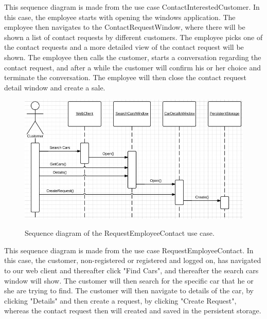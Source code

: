 This sequence diagram is made from the use case ContactInterestedCustomer. 
In this case, the employee starts with opening the windows application. The employee then navigates to the ContactRequestWindow, where there will be shown a list of contact requests by different customers. The employee picks one of the contact requests and a more detailed view of the contact request will be shown. The employee then calls the customer, starts a conversation regarding the contact request, and after a while the customer will confirm his or her choice and terminate the conversation. The employee will then close the contact request detail window and create a sale.

\begin{figure}[H]
	\centering
		\includegraphics[width=\textwidth]{Figures/SequenceDiagram-RequestEmployeeContact}\\
	\caption{Sequence diagram of the RequestEmployeeContact use case.}
  \label{fig:SequenceDiagram-RequestEmployeeContact}
\end{figure}

This sequence diagram is made from the use case RequestEmployeeContact. 
In this case, the customer, non-registered or registered and logged on, has navigated to our web client and thereafter click "Find Cars", and thereafter the search cars window will show. The customer will then search for the specific car that he or she are trying to find. The customer will then navigate to details of the car, by clicking "Details" and then create a request, by clicking "Create Request", whereas the contact request then will created and saved in the persistent storage.

